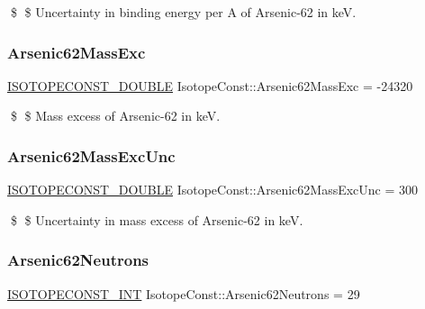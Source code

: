 \$ \$ Uncertainty in binding energy per A of Arsenic-\/62 in keV. \mbox{\label{group___isotope_const-_arsenic-_as62_ga799cbf34c8fa6ff73e2d3565a8cd40ca}} 
\subsubsection{\texorpdfstring{Arsenic62\+Mass\+Exc}{Arsenic62MassExc}}
{\footnotesize\ttfamily \mbox{\hyperlink{group___isotope_const-_macros_ga8f45a7272ce02c0b4c65c44636ed719a}{I\+S\+O\+T\+O\+P\+E\+C\+O\+N\+S\+T\+\_\+\+D\+O\+U\+B\+LE}} Isotope\+Const\+::\+Arsenic62\+Mass\+Exc = -\/24320}

\$ \$ Mass excess of Arsenic-\/62 in keV. \mbox{\label{group___isotope_const-_arsenic-_as62_gadc8087ef012c0191260d0f1e4e88a607}} 
\subsubsection{\texorpdfstring{Arsenic62\+Mass\+Exc\+Unc}{Arsenic62MassExcUnc}}
{\footnotesize\ttfamily \mbox{\hyperlink{group___isotope_const-_macros_ga8f45a7272ce02c0b4c65c44636ed719a}{I\+S\+O\+T\+O\+P\+E\+C\+O\+N\+S\+T\+\_\+\+D\+O\+U\+B\+LE}} Isotope\+Const\+::\+Arsenic62\+Mass\+Exc\+Unc = 300}

\$ \$ Uncertainty in mass excess of Arsenic-\/62 in keV. \mbox{\label{group___isotope_const-_arsenic-_as62_gaa9d9f87e581c96dd87c07c8afa5a264b}} 
\subsubsection{\texorpdfstring{Arsenic62\+Neutrons}{Arsenic62Neutrons}}
{\footnotesize\ttfamily \mbox{\hyperlink{group___isotope_const-_macros_ga5f18360b3e99483a35c32d789e62621c}{I\+S\+O\+T\+O\+P\+E\+C\+O\+N\+S\+T\+\_\+\+I\+NT}} Isotope\+Const\+::\+Arsenic62\+Neutrons = 29}

